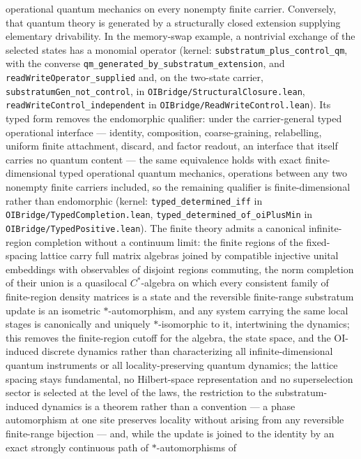 \documentclass[
]{article}
\begin{document}
operational quantum mechanics on every nonempty finite carrier.
Conversely, that quantum theory is generated by a structurally closed
extension supplying elementary drivability. In the memory-swap example,
a nontrivial exchange of the selected states has a monomial operator
(kernel: \texttt{substratum\_plus\_control\_qm}, with the converse
\texttt{qm\_generated\_by\_substratum\_extension}, and
\texttt{readWriteOperator\_supplied} and, on the two-state carrier,
\texttt{substratumGen\_not\_control}, in
\texttt{OIBridge/StructuralClosure.lean},
\texttt{readWriteControl\_independent} in
\texttt{OIBridge/ReadWriteControl.lean}). Its typed form removes the
endomorphic qualifier: under the carrier-general typed operational
interface --- identity, composition, coarse-graining, relabelling,
uniform finite attachment, discard, and factor readout, an interface
that itself carries no quantum content --- the same equivalence holds
with exact finite-dimensional typed operational quantum mechanics,
operations between any two nonempty finite carriers included, so the
remaining qualifier is finite-dimensional rather than endomorphic
(kernel: \texttt{typed\_determined\_iff} in
\texttt{OIBridge/TypedCompletion.lean},
\texttt{typed\_determined\_of\_oiPlusMin} in
\texttt{OIBridge/TypedPositive.lean}). The finite theory admits a
canonical infinite-region completion without a continuum limit: the
finite regions of the fixed-spacing lattice carry full matrix algebras
joined by compatible injective unital embeddings with observables of
disjoint regions commuting, the norm completion of their union is a
quasilocal \(C^{*}\)-algebra on which every consistent family of
finite-region density matrices is a state and the reversible
finite-range substratum update is an isometric \(*\)-automorphism, and
any system carrying the same local stages is canonically and uniquely
\(*\)-isomorphic to it, intertwining the dynamics; this removes the
finite-region cutoff for the algebra, the state space, and the
OI-induced discrete dynamics rather than characterizing all
infinite-dimensional quantum instruments or all locality-preserving
quantum dynamics; the lattice spacing stays fundamental, no
Hilbert-space representation and no superselection sector is selected at
the level of the laws, the restriction to the substratum-induced
dynamics is a theorem rather than a convention --- a phase automorphism
at one site preserves locality without arising from any reversible
finite-range bijection --- and, while the update is joined to the
identity by an exact strongly continuous path of \(*\)-automorphisms of
\end{document}
